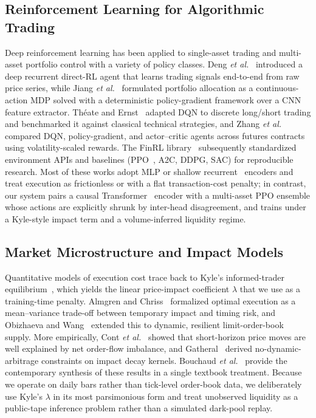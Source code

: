 \documentclass[conference]{IEEEtran}
\begin{document}
\subsection{Reinforcement Learning for Algorithmic Trading}
Deep reinforcement learning has been applied to single-asset trading and
multi-asset portfolio control with a variety of policy classes. Deng
\textit{et al.}~\cite{deng2017drltrading} introduced a deep recurrent
direct-RL agent that learns trading signals end-to-end from raw price
series, while Jiang \textit{et al.}~\cite{jiang2017portfolio} formulated
portfolio allocation as a continuous-action MDP solved with a
deterministic policy-gradient framework over a CNN feature extractor.
Th\'eate and Ernst~\cite{theate2021tdqn} adapted DQN to discrete
long/short trading and benchmarked it against classical technical
strategies, and Zhang \textit{et al.}~\cite{zhang2020drlportfolio}
compared DQN, policy-gradient, and actor--critic agents across futures
contracts using volatility-scaled rewards. The FinRL
library~\cite{liu2020finrl} subsequently standardized environment APIs
and baselines (PPO~\cite{schulman2017ppo}, A2C, DDPG, SAC) for
reproducible research. Most of these works adopt MLP or shallow
recurrent~\cite{hochreiter1997lstm} encoders and treat execution as
frictionless or with a flat transaction-cost penalty; in contrast, our
system pairs a causal Transformer~\cite{vaswani2017attention} encoder
with a multi-asset PPO ensemble whose actions are explicitly shrunk by
inter-head disagreement, and trains under a Kyle-style impact term and
a volume-inferred liquidity regime.

\subsection{Market Microstructure and Impact Models}
Quantitative models of execution cost trace back to Kyle's
informed-trader equilibrium~\cite{kyle1985impact}, which yields the
linear price-impact coefficient $\lambda$ that we use as a training-time
penalty. Almgren and Chriss~\cite{almgren2001execution} formalized
optimal execution as a mean--variance trade-off between temporary impact
and timing risk, and Obizhaeva and Wang~\cite{obizhaeva2013impact}
extended this to dynamic, resilient limit-order-book supply. More
empirically, Cont \textit{et al.}~\cite{cont2014priceimpact} showed that
short-horizon price moves are well explained by net order-flow
imbalance, and Gatheral~\cite{gatheral2010impact} derived
no-dynamic-arbitrage constraints on impact decay kernels.
Bouchaud \textit{et al.}~\cite{bouchaud2018trades} provide the
contemporary synthesis of these results in a single textbook treatment.
Because we operate on daily bars rather than tick-level
order-book data, we deliberately use Kyle's $\lambda$ in its most
parsimonious form and treat unobserved liquidity as a public-tape
inference problem rather than a simulated dark-pool replay.
\end{document}
